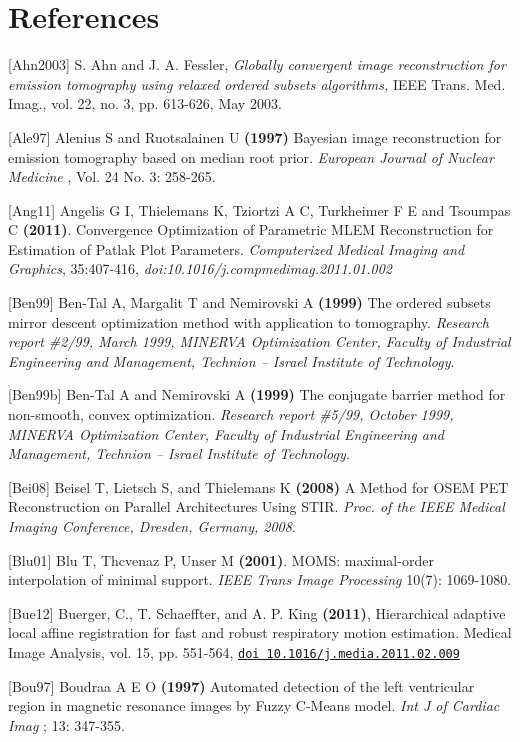 \documentclass{article}
\def\url#1#2{\mbox{\href{#1}{\tt #2}}}
\begin{document}
{{\section{
References}

{[}Ahn2003] S. Ahn and J. A. Fessler, \textit{Globally convergent image reconstruction for
emission tomography using relaxed ordered subsets algorithms,} IEEE
Trans. Med. Imag., vol. 22, no. 3, pp. 613-626, May 2003.

{[}Ale97] Alenius S and Ruotsalainen U \textbf{(1997)} Bayesian image 
reconstruction for emission tomography based on median root prior. \textit{European 
Journal of Nuclear Medicine} , Vol. 24 No. 3: 258-265.

{[}Ang11] Angelis G I, Thielemans K, Tziortzi A C, Turkheimer F E and Tsoumpas C  
\textbf{(2011)}. Convergence Optimization of Parametric MLEM Reconstruction for Estimation of Patlak Plot Parameters.  
\textit{Computerized Medical Imaging and Graphics}, 35:407-416,  
\textit{doi:10.1016/j.compmedimag.2011.01.002}

{[}Ben99] Ben-Tal A, Margalit T and Nemirovski A \textbf{(1999)} The 
ordered subsets mirror descent optimization method with application 
to tomography. \textit{Research report \#2/99, March 1999, MINERVA 
Optimization Center, Faculty of Industrial Engineering and Management, 
Technion -- Israel Institute of Technology}.

{[}Ben99b] Ben-Tal A and Nemirovski A \textbf{(1999)} The conjugate 
barrier method for non-smooth, convex optimization. \textit{Research 
report \#5/99, October 1999, MINERVA Optimization Center, Faculty 
of Industrial Engineering and Management, Technion -- Israel Institute 
of Technology.}

[Bei08] Beisel T, Lietsch S, and Thielemans K \textbf{(2008)}
A Method for OSEM PET Reconstruction on Parallel Architectures Using STIR.
\textit{Proc. of the IEEE Medical Imaging Conference, Dresden, Germany, 2008}.

{[}Blu01] Blu T, Thcvenaz P, Unser M \textbf{(2001)}. MOMS: maximal-order interpolation of minimal support.  \textit{IEEE Trans Image Processing} 10(7): 1069-1080.

[Bue12] Buerger, C., T. Schaeffter, and A. P. King \textbf{(2011)}, Hierarchical adaptive
local affine registration for fast and robust respiratory motion estimation.
Medical Image Analysis, vol. 15, pp. 551-564, 
\url{http://dx.doi.org/10.1016/j.media.2011.02.009}{doi 10.1016/j.media.2011.02.009} 

{[}Bou97] Boudraa \textsc{A E O} \textbf{(1997)} Automated detection of the 
left ventricular region in magnetic resonance images by Fuzzy 
C-Means model. \textit{Int J of Cardiac Imag} ; 13: 347-355.

}}
\end{document}
